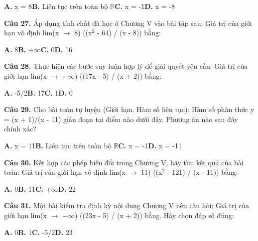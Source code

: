 \documentclass[11pt,a4paper]{article}
\begin{document}
\hspace*{1.5em}\textbf{A.} x = 8\quad\quad \textbf{B.} Liên tục trên toàn bộ $\mathbb{R}$\quad\quad \textbf{C.} x = -1\quad\quad \textbf{D.} x = -8\par\vspace{2pt}
\textbf{\color{primary} Câu 27.} Áp dụng tính chất đã học ở Chương V vào bài tập sau: Giá trị của giới hạn vô định lim(x $\to$ 8) ((x$^2$ - 64) / (x - 8)) bằng:\par
\hspace*{1.5em}\textbf{A.} 8\quad\quad \textbf{B.} +$\infty$\quad\quad \textbf{C.} 0\quad\quad \textbf{D.} 16\par\vspace{2pt}
\textbf{\color{primary} Câu 28.} Thực hiện các bước suy luận hợp lý để giải quyết yêu cầu: Giá trị của giới hạn lim(x $\to$ +$\infty$) ((17x - 5) / (x + 2)) bằng:\par
\hspace*{1.5em}\textbf{A.} -5/2\quad\quad \textbf{B.} 17\quad\quad \textbf{C.} 1\quad\quad \textbf{D.} 0\par\vspace{2pt}
\textbf{\color{primary} Câu 29.} Cho bài toán tự luyện (Giới hạn. Hàm số liên tục): Hàm số phân thức y = (x + 1)/(x - 11) gián đoạn tại điểm nào dưới đây. Phương án nào sau đây chính xác?\par
\hspace*{1.5em}\textbf{A.} x = 11\quad\quad \textbf{B.} Liên tục trên toàn bộ $\mathbb{R}$\quad\quad \textbf{C.} x = -1\quad\quad \textbf{D.} x = -11\par\vspace{2pt}
\textbf{\color{primary} Câu 30.} Kết hợp các phép biến đổi trong Chương V, hãy tìm kết quả của bài toán: Giá trị của giới hạn vô định lim(x $\to$ 11) ((x$^2$ - 121) / (x - 11)) bằng:\par
\hspace*{1.5em}\textbf{A.} 0\quad\quad \textbf{B.} 11\quad\quad \textbf{C.} +$\infty$\quad\quad \textbf{D.} 22\par\vspace{2pt}
\textbf{\color{primary} Câu 31.} Một bài kiểm tra định kỳ nội dung Chương V nêu câu hỏi: Giá trị của giới hạn lim(x $\to$ +$\infty$) ((23x - 5) / (x + 2)) bằng. Hãy chọn đáp số đúng:\par
\hspace*{1.5em}\textbf{A.} 0\quad\quad \textbf{B.} 1\quad\quad \textbf{C.} -5/2\quad\quad \textbf{D.} 23\par\vspace{2pt}
\end{document}
